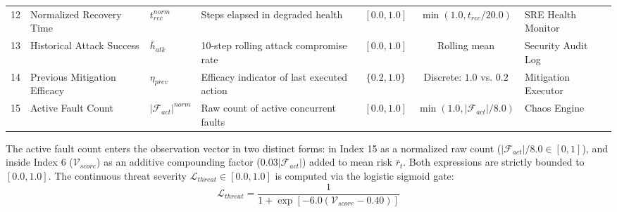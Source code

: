 \documentclass[ASNA,twocolumn]{USG}
\begin{document}
\begin{table}[!t]
{\begin{tabular}{clllccl}
12 & Normalized Recovery Time & $t_{rec}^{norm}$ & Steps elapsed in degraded health & $[0.0, 1.0]$ & $\min(1.0, t_{rec} / 20.0)$ & SRE Health Monitor \\
13 & Historical Attack Success & $\bar{h}_{atk}$ & 10-step rolling attack compromise rate & $[0.0, 1.0]$ & Rolling mean & Security Audit Log \\
14 & Previous Mitigation Efficacy & $\eta_{prev}$ & Efficacy indicator of last executed action & $\{0.2, 1.0\}$ & Discrete: $1.0$ vs. $0.2$ & Mitigation Executor \\
15 & Active Fault Count & $|\mathcal{F}_{act}|^{norm}$ & Raw count of active concurrent faults & $[0.0, 1.0]$ & $\min(1.0, |\mathcal{F}_{act}| / 8.0)$ & Chaos Engine \\
\bottomrule
\end{tabular}}
\end{table}

The active fault count enters the observation vector in two distinct forms: in Index 15 as a normalized raw count ($|\mathcal{F}_{act}|/8.0 \in [0, 1]$), and inside Index 6 ($\mathcal{V}_{score}$) as an additive compounding factor ($0.03|\mathcal{F}_{act}|$) added to mean risk $\bar{r}_t$. Both expressions are strictly bounded to $[0.0, 1.0]$. The continuous threat severity $\mathcal{L}_{threat} \in [0.0, 1.0]$ is computed via the logistic sigmoid gate:
\begin{equation}
    \mathcal{L}_{threat} = \frac{1}{1 + \exp\left[-6.0\left(\mathcal{V}_{score} - 0.40\right)\right]}
\end{equation}
\end{document}
